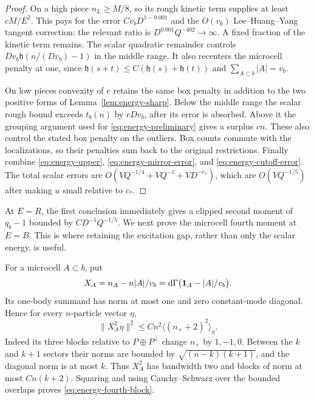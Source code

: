 \begin{proof}
On a high piece $n_L\ge M/8$, so its rough kinetic term supplies at
least $cM/E^2$.  This pays for the error $Cv_bD^{1-0.001}$ and the
$O(v_b)$ Lee--Huang--Yang tangent correction: the relevant ratio is
$D^{0.001}Q^{-402}\to\infty$.
A fixed fraction of the kinetic term remains.  The scalar quadratic
remainder controls $Dv_b\mathfrak h(n/(Dv_b)-1)$ in the middle range.
It also recenters the microcell penalty at one, since
$\mathfrak h(s+t)\le C(\mathfrak h(s)+\mathfrak h(t))$ and
$\sum_{A\subset b}|A|=v_b$.

On low pieces convexity of $e$ retains the same box penalty in addition
to the two positive forms of Lemma~\ref{lem:energy-sharp}.
Below the middle range the scalar rough bound exceeds $t_b(n)$ by
$cDv_b$, after its error is absorbed.  Above it the grouping argument
used for \eqref{eq:energy-preliminary} gives a surplus $cn$.
These also control the stated box penalty on the outliers.
Box counts commute with the localizations, so their penalties sum back
to the original restrictions.
Finally combine \eqref{eq:energy-upper},
\eqref{eq:energy-mirror-error}, and \eqref{eq:energy-cutoff-error}.
The total scalar errors are
$O(VQ^{-1/4}+VQ^{-1}+VD^{-c_*})$, which are
$O(VQ^{-1/5})$ after making $u$ small relative to $c_*$.
\end{proof}

At $E=R$, the first conclusion immediately gives a clipped second
moment of $q_b-1$ bounded by $CD^{-1}Q^{-1/5}$.  We next prove the
microcell fourth moment at $E=B$.  This is where retaining the
excitation gap, rather than only the scalar energy, is useful.

For a microcell $A\subset b$, put
\[
 X_A=n_A-n|A|/v_b
     =\mathrm d\Gamma\bigl(\mathbf 1_A-|A|/v_b\bigr).
\]
Its one-body summand has norm at most one and zero constant-mode
diagonal.  Hence for every $n$-particle vector $\eta$,
\begin{equation}\label{eq:energy-fourth-block}
                    \|X_A^2\eta\|^2
          \le Cn^2\langle(n_++2)^2\rangle_\eta.
\end{equation}
Indeed its three blocks relative to $P\oplus P^\perp$ change $n_+$
by $1,-1,0$.  Between the $k$ and $k+1$ sectors their norms are bounded
by $\sqrt{(n-k)(k+1)}$, and the diagonal norm is at most $k$.
Thus $X_A^2$ has bandwidth two and blocks of norm at most $Cn(k+2)$.
Squaring and using Cauchy--Schwarz over the bounded overlaps proves
\eqref{eq:energy-fourth-block}.

